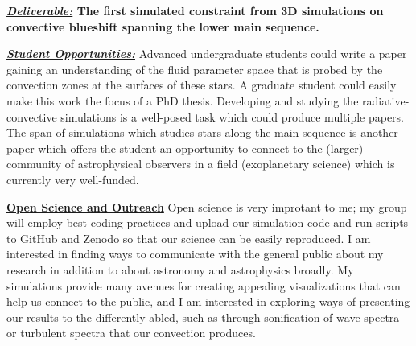 \documentclass[12pt]{article}
\newcommand{\sct}[1]{\vspace{0.3cm}\hspace{-\parindent}\textbf{\underline{#1}}\hspace{0.3cm}}
\begin{document}
\textbf{\underline{\emph{Deliverable:}} The first simulated constraint from 3D simulations on convective blueshift spanning the lower main sequence.}

\textbf{\underline{\emph{Student Opportunities:}}} Advanced undergraduate students could write a paper gaining an understanding of the fluid parameter space that is probed by the convection zones at the surfaces of these stars.
A graduate student could easily make this work the focus of a PhD thesis.
Developing and studying the radiative-convective simulations is a well-posed task which could produce multiple papers.
The span of simulations which studies stars along the main sequence is another paper which offers the student an opportunity to connect to the (larger) community of astrophysical observers in a field (exoplanetary science) which is currently very well-funded.


\sct{Open Science and Outreach}
Open science is very improtant to me; my group will employ best-coding-practices and upload our simulation code and run scripts to GitHub and Zenodo so that our science can be easily reproduced.
I am interested in finding ways to communicate with the general public about my research in addition to about astronomy and astrophysics broadly.
My simulations provide many avenues for creating appealing visualizations that can help us connect to the public, and I am interested in exploring ways of presenting our results to the differently-abled, such as through sonification of wave spectra or turbulent spectra that our convection produces.

{\scriptsize

}
\end{document}
